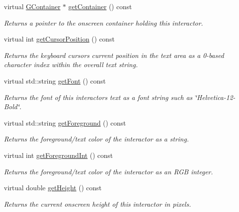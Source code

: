 \begin{DoxyCompactItemize}
virtual \mbox{\hyperlink{classsgl_1_1GContainer}{G\+Container}} $\ast$ \mbox{\hyperlink{classsgl_1_1GInteractor_a7a6e317c29d61030929b4cd2d1c00fe7}{get\+Container}} () const
\begin{DoxyCompactList}\small\item\em Returns a pointer to the onscreen container holding this interactor. \end{DoxyCompactList}\item 
virtual int \mbox{\hyperlink{classsgl_1_1GTextArea_aa85d2267b4534eb372cd3114ea61ba3b}{get\+Cursor\+Position}} () const
\begin{DoxyCompactList}\small\item\em Returns the keyboard cursor\textquotesingle{}s current position in the text area as a 0-\/based character index within the overall text string. \end{DoxyCompactList}\item 
virtual std\+::string \mbox{\hyperlink{classsgl_1_1GInteractor_a894a5502900794eeb27d084c21f1d77d}{get\+Font}} () const
\begin{DoxyCompactList}\small\item\em Returns the font of this interactor\textquotesingle{}s text as a font string such as \char`\"{}\+Helvetica-\/12-\/\+Bold\char`\"{}. \end{DoxyCompactList}\item 
virtual std\+::string \mbox{\hyperlink{classsgl_1_1GInteractor_a4fa2d8b0192a3a5b4af4bbfe71194d03}{get\+Foreground}} () const
\begin{DoxyCompactList}\small\item\em Returns the foreground/text color of the interactor as a string. \end{DoxyCompactList}\item 
virtual int \mbox{\hyperlink{classsgl_1_1GInteractor_ac3b12ab385a6ef9ae90fc879860ba726}{get\+Foreground\+Int}} () const
\begin{DoxyCompactList}\small\item\em Returns the foreground/text color of the interactor as an R\+GB integer. \end{DoxyCompactList}\item 
virtual double \mbox{\hyperlink{classsgl_1_1GInteractor_a1e7e353362434072875264cf95629f99}{get\+Height}} () const
\begin{DoxyCompactList}\small\item\em Returns the current onscreen height of this interactor in pixels. \end{DoxyCompactList}\item 

\end{DoxyCompactItemize}
